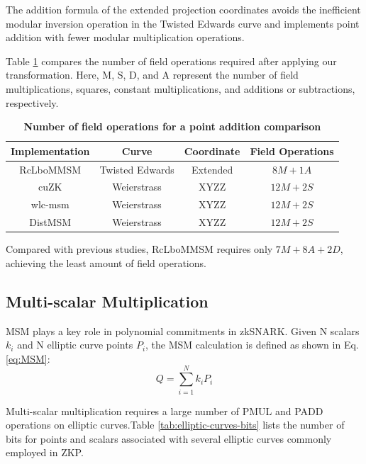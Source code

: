 \documentclass[journal=tches,final]{iacrtrans}
\begin{document}
The addition formula of the extended projection coordinates avoids the inefficient modular inversion operation in the Twisted Edwards curve and implements point addition with fewer modular multiplication operations.

Table \ref{tab:field-operations} compares the number of field operations required after applying our transformation. Here, M, S, D, and A represent the number of field multiplications, squares, constant multiplications, and additions or subtractions, respectively.

\begin{table}[htbp]
    \caption{\textbf{Number of field operations for a point addition comparison}}
    \begin{center}
    \begin{tabular}{|c|c|c|c|}
    \hline
    \textbf{Implementation} & \textbf{Curve} & \textbf{Coordinate} & \textbf{Field Operations} \\
    \hline
    RcLboMMSM & Twisted Edwards & Extended & $8M + 1A$ \\
    \hline
    cuZK & Weierstrass & XYZZ & $12M + 2S$ \\
    \hline
    wlc-msm & Weierstrass & XYZZ & $12M + 2S$ \\
    \hline
    DistMSM & Weierstrass & XYZZ & $12M + 2S$ \\
    \hline
    \end{tabular}
    \label{tab:field-operations}
    \end{center}
\end{table}

Compared with previous studies, RcLboMMSM requires only $7M + 8A + 2D$, achieving the least amount of field operations.

\subsection{Multi-scalar Multiplication}

MSM plays a key role in polynomial commitments in zkSNARK. Given N scalars $k_i$ and N elliptic curve points $P_i$, the MSM calculation is defined as shown in Eq. \eqref{eq:MSM}:
\begin{equation}
    \label{eq:MSM}
    Q=\sum_{i=1}^Nk_iP_i
\end{equation}

Multi-scalar multiplication requires a large number of PMUL and PADD operations on elliptic curves.Table \ref{tab:elliptic-curves-bits} lists the number of bits for points and scalars associated with several elliptic curves commonly employed in ZKP.
\end{document}
